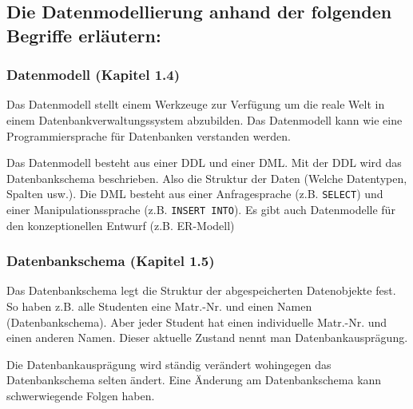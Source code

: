 \subsection{Die Datenmodellierung anhand der folgenden Begriffe erläutern:}

\subsubsection{Datenmodell (Kapitel 1.4)}

Das Datenmodell stellt einem Werkzeuge zur Verfügung um die reale Welt in einem Datenbankverwaltungssystem abzubilden. Das Datenmodell kann wie eine Programmiersprache für Datenbanken verstanden werden. 

Das Datenmodell besteht aus einer \ac{DDL} und einer \ac{DML}. Mit der \ac{DDL} wird das Datenbankschema beschrieben. Also die Struktur der Daten (Welche Datentypen, Spalten usw.). Die \ac{DML} besteht aus einer Anfragesprache (z.B. \verb|SELECT|) und einer Manipulationssprache (z.B. \verb|INSERT INTO|). Es gibt auch Datenmodelle für den konzeptionellen Entwurf (z.B. ER-Modell)

\subsubsection{Datenbankschema (Kapitel 1.5)}

Das Datenbankschema legt die Struktur der abgespeicherten Datenobjekte fest. So haben  z.B. alle Studenten eine Matr.-Nr. und einen Namen (Datenbankschema). Aber jeder Student hat einen individuelle Matr.-Nr. und einen anderen Namen. Dieser aktuelle Zustand nennt man Datenbankausprägung. 

Die Datenbankausprägung wird ständig verändert wohingegen das Datenbankschema selten ändert. Eine Änderung am Datenbankschema kann schwerwiegende Folgen haben.